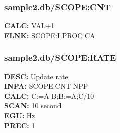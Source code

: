 \documentclass[12pt]{article}
\begin{document}
\subsubsection{sample2.db/SCOPE:CNT}
\textbf{CALC: }VAL+1 \\
\textbf{FLNK: }SCOPE:I.PROC CA \\
\newpage
\subsubsection{sample2.db/SCOPE:RATE}
\textbf{DESC: }Update rate \\
\textbf{INPA: }SCOPE:CNT NPP \\
\textbf{CALC: }C:=A-B;B:=A;C\slash 10 \\
\textbf{SCAN: }10 second \\
\textbf{EGU: }Hz \\
\textbf{PREC: }1 \\
\newpage
\end{document}
